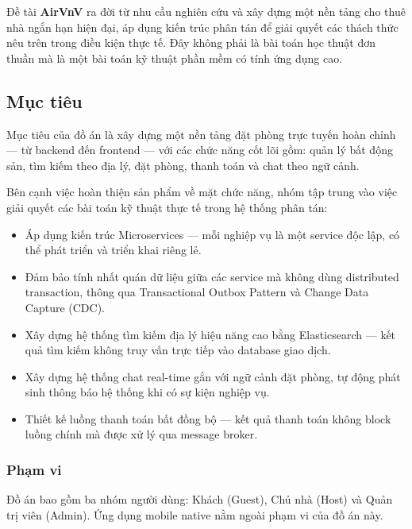 Đề tài \textbf{AirVnV} ra đời từ nhu cầu nghiên cứu và xây dựng một nền tảng cho thuê nhà ngắn
hạn hiện đại, áp dụng kiến trúc phân tán để giải quyết các thách thức nêu trên trong điều kiện
thực tế. Đây không phải là bài toán học thuật đơn thuần mà là một bài toán kỹ thuật phần mềm
có tính ứng dụng cao.

\subsection{Mục tiêu}
\label{subsec:muc_tieu}

Mục tiêu của đồ án là xây dựng một nền tảng đặt phòng trực tuyến hoàn chỉnh — từ backend đến
frontend — với các chức năng cốt lõi gồm: quản lý bất động sản, tìm kiếm theo địa lý, đặt phòng,
thanh toán và chat theo ngữ cảnh.

Bên cạnh việc hoàn thiện sản phẩm về mặt chức năng, nhóm tập trung vào việc giải quyết
các bài toán kỹ thuật thực tế trong hệ thống phân tán:

\begin{itemize}
    \item Áp dụng kiến trúc Microservices — mỗi nghiệp vụ là một service độc lập, có thể
    phát triển và triển khai riêng lẻ.

    \item Đảm bảo tính nhất quán dữ liệu giữa các service mà không dùng distributed transaction,
    thông qua Transactional Outbox Pattern và Change Data Capture (CDC).

    \item Xây dựng hệ thống tìm kiếm địa lý hiệu năng cao bằng Elasticsearch — kết quả tìm kiếm
    không truy vấn trực tiếp vào database giao dịch.

    \item Xây dựng hệ thống chat real-time gắn với ngữ cảnh đặt phòng, tự động phát sinh
    thông báo hệ thống khi có sự kiện nghiệp vụ.

    \item Thiết kế luồng thanh toán bất đồng bộ — kết quả thanh toán không block luồng chính
    mà được xử lý qua message broker.
\end{itemize}

\subsubsection*{Phạm vi}

Đồ án bao gồm ba nhóm người dùng: Khách (Guest), Chủ nhà (Host) và Quản trị viên (Admin).
Ứng dụng mobile native nằm ngoài phạm vi của đồ án này.


